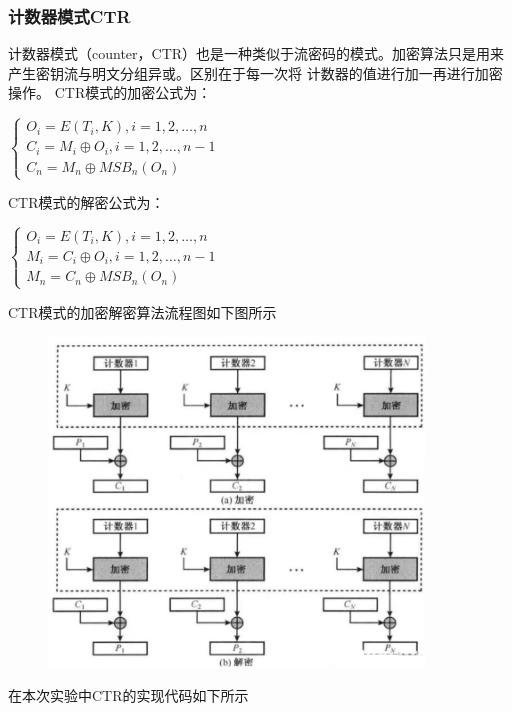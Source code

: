 \documentclass[a4paper,11pt,UTF8]{ctexart}
\newcommand{\bottomcaption}{%
\setlength{\abovecaptionskip}{6pt}%
\setlength{\belowcaptionskip}{6pt}%
\caption}
\newcommand{\xiaowuhao}{\fontsize{9pt}{\baselineskip}\selectfont}   %
\begin{document}
        \subsubsection{计数器模式CTR}
            计数器模式（counter，CTR）也是一种类似于流密码的模式。加密算法只是用来产生密钥流与明文分组异或。区别在于每一次将
            计数器的值进行加一再进行加密操作。
            CTR模式的加密公式为：\par
            $ \left\{\begin{matrix}O_{i}=E(T_{i},K),i=1,2,\dots ,n 
                \\ C_{i}=M_{i}\oplus O_{i},i=1,2,\dots ,n-1\\C_{n}=M_{n}\oplus MSB_{n}(O_{n})\end{matrix}\right.$\par
            CTR模式的解密公式为：\par
            $\left\{\begin{matrix}O_{i}=E(T_{i},K),i=1,2,\dots ,n \\ 
                M_{i}=C_{i}\oplus O_{i},i=1,2,\dots ,n-1\\M_{n}=C_{n}\oplus MSB_{n}(O_{n})\end{matrix}\right.$\par
\newpage
            CTR模式的加密解密算法流程图如下图所示
            \begin{figure}[H]
                \centering
                \includegraphics[width=10cm]{CTR.png}
                \bottomcaption{\xiaowuhao{CTR加解密流程}}
            \end{figure}
            在本次实验中CTR的实现代码如下所示
            
\end{document}
